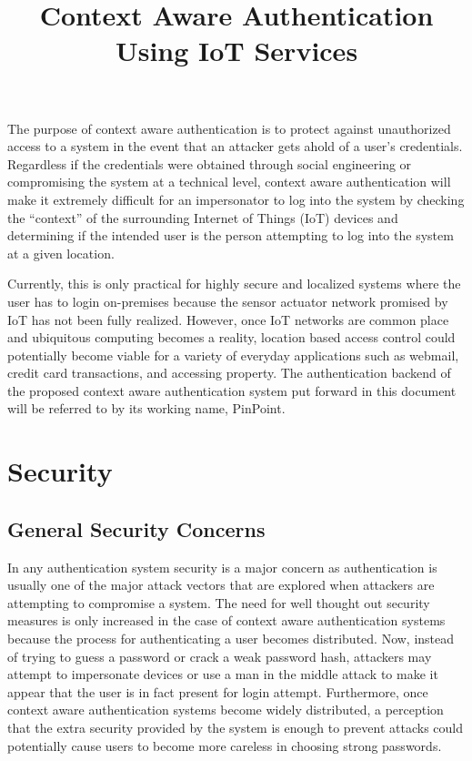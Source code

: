 \documentclass[12pt,journal]{IEEEtran}
\begin{document}
\title{Context Aware Authentication Using IoT Services}


The  purpose  of  context  aware  authentication  is  to protect  against  unauthorized  access  to  a  system  in  the event  that  an  attacker  gets  ahold  of  a  user’s  credentials.  Regardless if the credentials were obtained through social engineering  or  compromising  the  system  at  a  technical level,    context    aware    authentication    will    make    it extremely  difficult  for  an  impersonator  to  log  into  the system  by  checking  the  “context”  of  the  surrounding Internet  of  Things  (IoT)  devices  and  determining  if  the intended  user  is  the  person  attempting  to  log  into  the system at a given location.  

Currently, this is only practical for highly secure and localized systems where the user has to login on-premises because the sensor actuator network promised by IoT has not been fully realized. However, once IoT networks are common place and ubiquitous computing becomes a reality, location based access control could potentially become viable for a variety of everyday applications such as webmail, credit card transactions, and accessing property.  The authentication backend of the proposed context aware authentication system put forward in this document will be referred to by its working name, PinPoint.

\section{Security}
\subsection{General Security Concerns}

In any authentication system security is a major concern as authentication is usually one of the major attack vectors that are explored when attackers are attempting to compromise a system. The need for well thought out security measures is only increased in the case of context aware authentication systems because the process for authenticating a user becomes distributed. Now, instead of trying to guess a password or crack a weak password hash, attackers may attempt to impersonate devices or use a man in the middle attack to make it appear that the user is in fact present for login attempt. Furthermore, once context aware authentication systems become widely distributed, a perception that the extra security provided by the system is enough to prevent attacks could potentially cause users to become more careless in choosing strong passwords.
\end{document}
